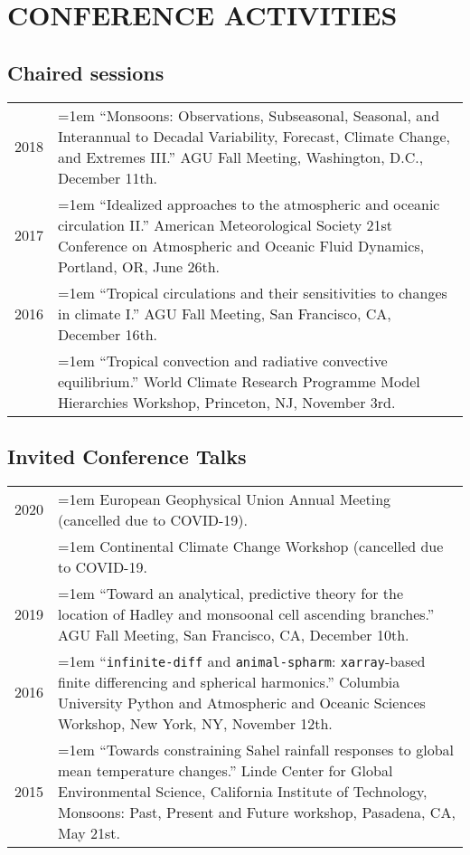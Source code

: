 \documentclass[letterpaper,11pt]{shillcv}
\begin{document}
\section*{CONFERENCE ACTIVITIES}
\subsection*{Chaired sessions}
\begin{longtable}{@{} >{\color{darkgray}} p{} p{} @{}}
2018 & \hangindent=1em ``Monsoons: Observations, Subseasonal, Seasonal, and Interannual to Decadal Variability, Forecast, Climate Change, and Extremes III.''  AGU Fall Meeting, Washington, D.C., December 11th. \\
2017 & \hangindent=1em ``Idealized approaches to the atmospheric and oceanic circulation II.'' American Meteorological Society 21st Conference on Atmospheric and Oceanic Fluid Dynamics, Portland, OR, June 26th.\\
2016 & \hangindent=1em ``Tropical circulations and their sensitivities to changes in climate I.''  AGU Fall Meeting, San Francisco, CA, December 16th.\\
     & \hangindent=1em ``Tropical convection and radiative convective equilibrium.''  World Climate Research Programme Model Hierarchies Workshop, Princeton, NJ, November 3rd.\\
\end{longtable}

\subsection*{Invited Conference Talks}
\begin{longtable}{@{} >{\color{darkgray}} p{} p{} @{}}
2020 & \hangindent=1em European Geophysical Union Annual Meeting (cancelled due to COVID-19).\\
     & \hangindent=1em Continental Climate Change Workshop (cancelled due to COVID-19.\\
2019 & \hangindent=1em ``Toward an analytical, predictive theory for the location of Hadley and monsoonal cell ascending branches.''  AGU Fall Meeting, San Francisco, CA, December 10th.\\
2016 & \hangindent=1em ``\texttt{infinite-diff} and \texttt{animal-spharm}: \texttt{xarray}-based finite differencing and spherical harmonics.''  Columbia University Python and Atmospheric and Oceanic Sciences Workshop, New York, NY, November 12th.\\
2015 & \hangindent=1em ``Towards constraining Sahel rainfall responses to global mean temperature changes.''   Linde Center for Global Environmental Science, California Institute of Technology, Monsoons: Past, Present and Future workshop, Pasadena, CA, May 21st.\\
\end{longtable}
\end{document}
